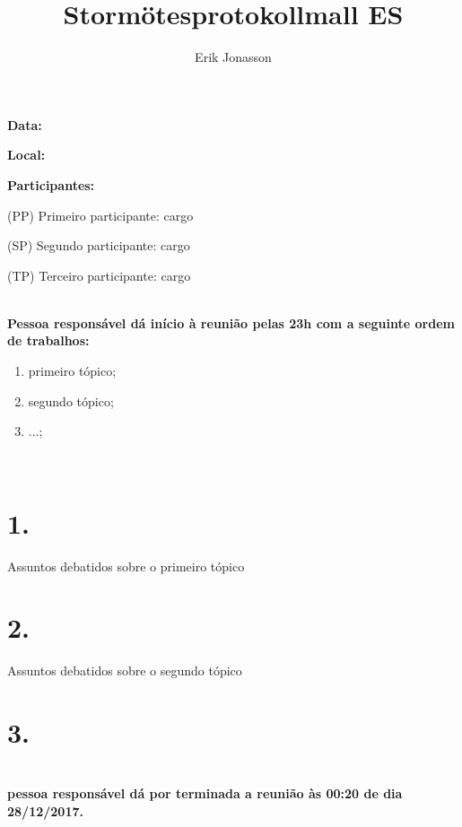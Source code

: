 \documentclass[a4paper, 11pt]{article}
\title{Stormötesprotokollmall ES}
\author{Erik Jonasson}
\begin{document}
\pagestyle{style1}

\textbf{Data:} %

\textbf{Local:} %

\textbf{Participantes:} 
\begin{description}
\item (PP) Primeiro participante: cargo
\item (SP) Segundo participante: cargo 
\item (TP) Terceiro participante: cargo
\end{description}

\makebox[\linewidth]{\rule{\linewidth}{0.4pt}}\\
\textbf{Pessoa responsável dá início à reunião pelas 23h com a seguinte ordem de trabalhos:} 
\begin{enumerate}
\item primeiro tópico;
\item segundo tópico;
\item ...;

\end{enumerate}
\makebox[\linewidth]{\rule{\linewidth}{0.4pt}}\\

\section*{1.}
Assuntos debatidos sobre o primeiro tópico
\section*{2. }
Assuntos debatidos sobre o segundo tópico

\section*{3.}
 
 \section*{}
\textbf{pessoa responsável dá por terminada a reunião às 00:20 de dia 28/12/2017.}
\end{document}

